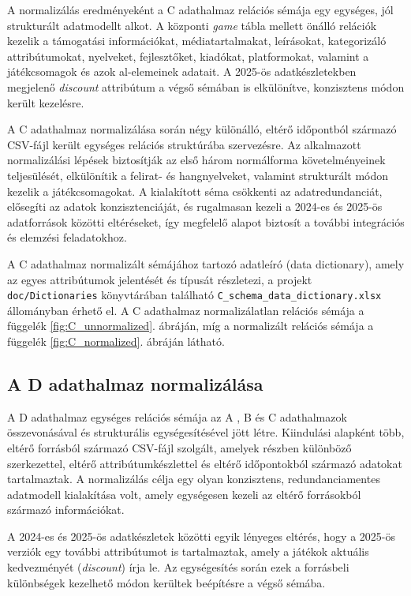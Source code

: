 A normalizálás eredményeként a C adathalmaz relációs sémája egy egységes, jól strukturált adatmodellt alkot. A központi \textit{game} tábla mellett önálló relációk kezelik a támogatási információkat, médiatartalmakat, leírásokat, kategorizáló attribútumokat, nyelveket, fejlesztőket, kiadókat, platformokat, valamint a játékcsomagok és azok al-elemeinek adatait. A 2025-ös adatkészletekben megjelenő \textit{discount} attribútum a végső sémában is elkülönítve, konzisztens módon került kezelésre.

A C adathalmaz normalizálása során négy különálló, eltérő időpontból származó CSV-fájl került egységes relációs struktúrába szervezésre. Az alkalmazott normalizálási lépések biztosítják az első három normálforma követelményeinek teljesülését, elkülönítik a felirat- és hangnyelveket, valamint strukturált módon kezelik a játékcsomagokat. A kialakított séma csökkenti az adatredundanciát, elősegíti az adatok konzisztenciáját, és rugalmasan kezeli a 2024-es és 2025-ös adatforrások közötti eltéréseket, így megfelelő alapot biztosít a további integrációs és elemzési feladatokhoz.

A C adathalmaz normalizált sémájához tartozó adatleíró (data dictionary),
amely az egyes attribútumok jelentését és típusát részletezi, a projekt
\texttt{doc/Dictionaries} könyvtárában található
\texttt{C\_schema\_data\_dictionary.xlsx} állományban érhető el. A C
adathalmaz normalizálatlan relációs sémája a függelék
\ref{fig:C_unnormalized}. ábráján, míg a normalizált relációs sémája a
függelék \ref{fig:C_normalized}. ábráján látható.

\subsection{A D adathalmaz normalizálása}

A D adathalmaz egységes relációs sémája az A \cite{a}, B \cite{b} és C \cite{c} adathalmazok összevonásával és strukturális egységesítésével jött létre. Kiindulási alapként több, eltérő forrásból származó CSV-fájl szolgált, amelyek részben különböző szerkezettel, eltérő attribútumkészlettel és eltérő időpontokból származó adatokat tartalmaztak. A normalizálás célja egy olyan konzisztens, redundanciamentes adatmodell kialakítása volt, amely egységesen kezeli az eltérő forrásokból származó információkat.

A 2024-es és 2025-ös adatkészletek közötti egyik lényeges eltérés, hogy a 2025-ös verziók egy további attribútumot is tartalmaztak, amely a játékok aktuális kedvezményét (\textit{discount}) írja le. Az egységesítés során ezek a forrásbeli különbségek kezelhető módon kerültek beépítésre a végső sémába.

